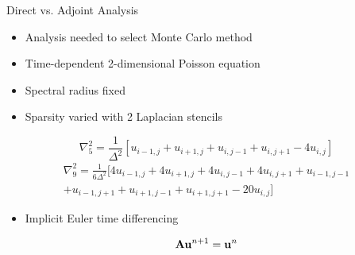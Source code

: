\documentclass{beamer}
\begin{document}
\begin{frame}{Direct vs. Adjoint Analysis}

  \begin{itemize}
  \item Analysis needed to select Monte Carlo method
  \item Time-dependent 2-dimensional Poisson equation
  \item Spectral radius fixed
  \item Sparsity varied with 2 Laplacian stencils
  \end{itemize}

  \[
  \nabla^2_5 = \frac{1}{\Delta^2}[u_{i-1,j} + u_{i+1,j} + u_{i,j-1} +
    u_{i,j+1} - 4 u_{i,j}]
  \]
  \[
  \begin{split}
    \nabla^2_9 = \frac{1}{6\Delta^2}[4 u_{i-1,j} + 4 u_{i+1,j} + 4
      u_{i,j-1} + 4 u_{i,j+1} + u_{i-1,j-1}\\ + u_{i-1,j+1} +
      u_{i+1,j-1} + u_{i+1,j+1} - 20 u_{i,j}]
  \end{split}
  \]

  \begin{itemize}
  \item Implicit Euler time differencing
  \end{itemize}

  \[
  \mathbf{A} \mathbf{u}^{n+1} = \mathbf{u}^n
  \]

\end{frame}
\end{document}
